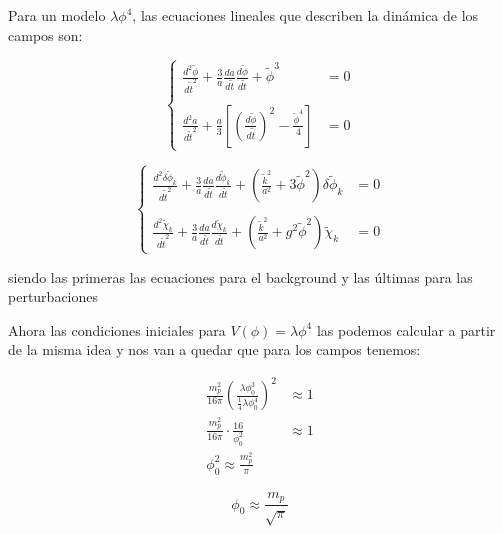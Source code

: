 Para un modelo $\lambda \phi^4$, las ecuaciones lineales que describen la dinámica de los campos son:

\begin{equation}
    \begin{cases}
        \displaystyle \frac{d^2 \tilde{\phi}}{d \tilde{t}^2} + \frac{3}{a} \frac{d a}{d \tilde{t}} \frac{d \tilde{\phi}}{d \tilde{t}} + \tilde{\phi}^3 &= 0  \\ \\
        \displaystyle \frac{d^2 a}{d \tilde{t}^2} + \frac{a}{3} \left[ \left( \frac{d \tilde{\phi}}{d \tilde{t}} \right)^2 - \frac{\tilde{\phi}^4}{4} \right] &= 0
    \end{cases}
\end{equation}

\begin{equation}
  \begin{cases}
    \displaystyle \frac{d^2 \delta \tilde{\phi}_k}{d \tilde{t}^2} + \frac{3}{a} \frac{d a}{d \tilde{t}} \frac{d \tilde{\phi}_k}{d \tilde{t}} + \left( \frac{\tilde{k}^2}{a^2} + 3 \tilde{\phi}^2 \right) \delta \tilde{\phi}_k &= 0\\ \\
    \displaystyle \frac{d^2 \tilde{\chi}_k}{d \tilde{t}^2} + \frac{3}{a} \frac{d a}{d \tilde{t}} \frac{d \tilde{\chi}_k}{d \tilde{t}} + \left( \frac{\tilde{k}^2}{a^2} + g^2 \tilde{\phi}^2 \right) \tilde{\chi}_k &= 0
    \end{cases}
\end{equation}

\noindent
siendo las primeras las ecuaciones para el background y las últimas para las perturbaciones

Ahora las condiciones iniciales para $V(\phi) = \lambda \phi^4$ las podemos calcular a partir de la misma idea y nos van a quedar que para los campos tenemos:

\begin{equation*}
    \begin{split}
        \frac{m_p^2}{16 \pi} \left( \frac{\lambda \phi_0^3}{\displaystyle \frac{1}{4} \lambda \phi_0^4} \right)^2 &\approx 1\\
        \frac{m_p^2}{16 \pi} \cdot \frac{16}{\phi_0^2} &\approx 1\\
        \phi_0^2 \approx \frac{m_p^2}{\pi}
    \end{split}
\end{equation*}

\begin{equation}
    \phi_0 \approx \frac{m_p}{\sqrt{\pi}}
\end{equation}

